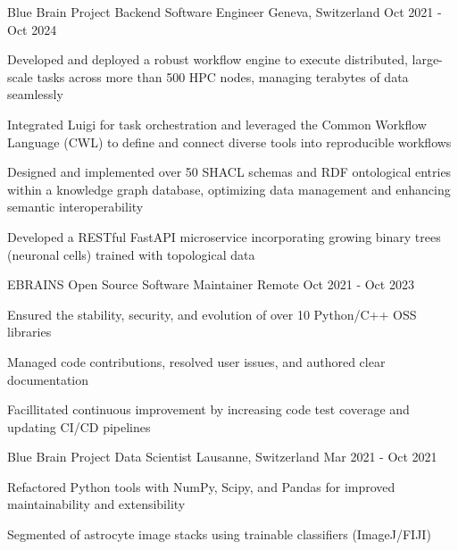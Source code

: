 \begin{cventries}
\cventry
{Blue Brain Project} %
{Backend Software Engineer} %
{Geneva, Switzerland} %
{Oct 2021 - Oct 2024} %
{ %
\begin{cvitems}
\item{Developed and deployed a robust workflow engine to execute distributed, large-scale tasks across more than 500 HPC nodes, managing terabytes of data seamlessly}
\item{Integrated Luigi for task orchestration and leveraged the Common Workflow Language (CWL) to define and connect diverse tools into reproducible workflows}
\item{Designed and implemented over 50 SHACL schemas and RDF ontological entries within a knowledge graph database, optimizing data management and enhancing semantic interoperability}
\item{Developed a RESTful FastAPI microservice incorporating growing binary trees (neuronal cells) trained with topological data}
\end{cvitems}
}

\cventry
{EBRAINS}
{Open Source Software Maintainer} %
{Remote} %
{Oct 2021 - Oct 2023} %
{ %
\begin{cvitems}
\item{Ensured the stability, security, and evolution of over 10 Python/C++ OSS libraries}
\item{Managed code contributions, resolved user issues, and authored clear documentation}
\item{Facillitated continuous improvement by increasing code test coverage and updating CI/CD pipelines}
\end{cvitems}
}



\cventry
{Blue Brain Project}
{Data Scientist} %
{Lausanne, Switzerland} %
{Mar 2021 - Oct 2021} %
{ %
\begin{cvitems}
\item{Refactored Python tools with NumPy, Scipy, and Pandas for improved maintainability and extensibility}
\item{Segmented of astrocyte image stacks using trainable classifiers (ImageJ/FIJI)}
\end{cvitems}
}


\end{cventries}
